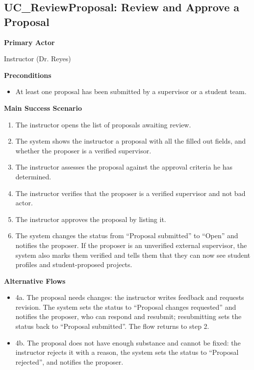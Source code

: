 \documentclass[12pt]{article}
\newcounter{tin}
\begin{document}
\subsection{UC\_ReviewProposal: Review and Approve a Proposal}

\textbf{Primary Actor}

Instructor (Dr. Reyes)

\textbf{Preconditions}
\begin{itemize}
  \item At least one proposal has been submitted by a supervisor or a student
    team.
\end{itemize}

\textbf{Main Success Scenario}
\begin{enumerate}
  \item The instructor opens the list of proposals awaiting review.
  \item The system shows the instructor a proposal with all the filled out fields, and whether the proposer is a verified supervisor.
  \item The instructor assesses the proposal against the approval criteria he has determined.
  \item The instructor verifies that the proposer is a verified supervisor and not bad actor.
  \item The instructor approves the proposal by listing it.
  \item The system changes the status from ``Proposal submitted'' to ``Open'' and notifies the
    proposer. If the proposer is an unverified external supervisor, the system also marks them verified and
    tells them that they can now see student profiles and student-proposed projects.
\end{enumerate}

\textbf{Alternative Flows}
\begin{itemize}
  \item 4a. The proposal needs changes: the instructor writes feedback and
    requests revision. The system sets the status to ``Proposal changes requested'' and notifies
    the proposer, who can respond and resubmit; resubmitting sets the status back to ``Proposal
    submitted''. The flow returns to step 2.
  \item 4b. The proposal does not have enough substance and cannot be fixed:
    the instructor rejects it with a reason, the system sets the status to ``Proposal rejected'',
    and notifies the proposer.
\end{itemize}
\end{document}
